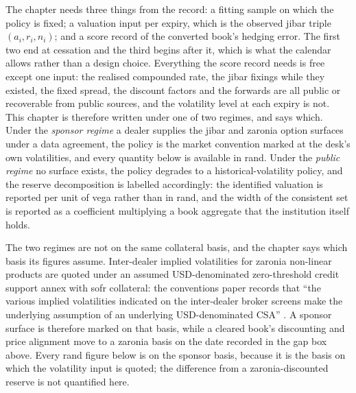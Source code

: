 \documentclass[../../../main.tex]{subfiles}
\begin{document}
The chapter needs three things from the record: a fitting sample on which the policy is fixed; a valuation input per expiry, which is the observed \gls{jibar} triple $(a_i,r_i,n_i)$; and a score record of the converted book's hedging error. The first two end at cessation and the third begins after it, which is what the calendar allows rather than a design choice. Everything the score record needs is free except one input: the realised compounded rate, the \gls{jibar} fixings while they existed, the fixed spread, the discount factors and the forwards are all public or recoverable from public sources, and the volatility level at each expiry is not. This chapter is therefore written under one of two regimes, and says which. Under the \emph{sponsor regime} a dealer supplies the \gls{jibar} and \gls{zaronia} option surfaces under a data agreement, the policy is the market convention marked at the desk's own volatilities, and every quantity below is available in rand. Under the \emph{public regime} no surface exists, the policy degrades to a historical-volatility policy, and the reserve decomposition is labelled accordingly: the identified valuation is reported per unit of vega rather than in rand, and the width of the consistent set is reported as a coefficient multiplying a book aggregate that the institution itself holds.

The two regimes are not on the same collateral basis, and the chapter says which basis its figures assume. Inter-dealer implied volatilities for \gls{zaronia} non-linear products are quoted under an assumed USD-denominated zero-threshold credit support annex with \gls{sofr} collateral: the conventions paper records that ``the various implied volatilities indicated on the inter-dealer broker screens make the underlying assumption of an underlying USD-denominated CSA'' \citep[\S8.2, p.~27]{sarb2024conv}. A sponsor surface is therefore marked on that basis, while a cleared book's discounting and price alignment move to a \gls{zaronia} basis on the date recorded in the gap box above. Every rand figure below is on the sponsor basis, because it is the basis on which the volatility input is quoted; the difference from a \gls{zaronia}-discounted reserve is not quantified here.

\end{document}
